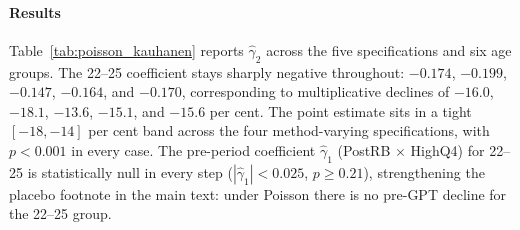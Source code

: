 \documentclass[preprint,12pt,authoryear]{elsarticle}
\begin{document}
\paragraph{Results}
Table~\ref{tab:poisson_kauhanen} reports $\hat\gamma_2$ across the five specifications and six age groups. The 22--25 coefficient stays sharply negative throughout: $-0.174$, $-0.199$, $-0.147$, $-0.164$, and $-0.170$, corresponding to multiplicative declines of $-16.0$, $-18.1$, $-13.6$, $-15.1$, and $-15.6$ per cent. The point estimate sits in a tight $[-18, -14]$ per cent band across the four method-varying specifications, with $p<0.001$ in every case. The pre-period coefficient $\hat\gamma_1$ (PostRB $\times$ HighQ4) for 22--25 is statistically null in every step ($|\hat\gamma_1|<0.025$, $p\geq 0.21$), strengthening the placebo footnote in the main text: under Poisson there is no pre-GPT decline for the 22--25 group.
\end{document}
